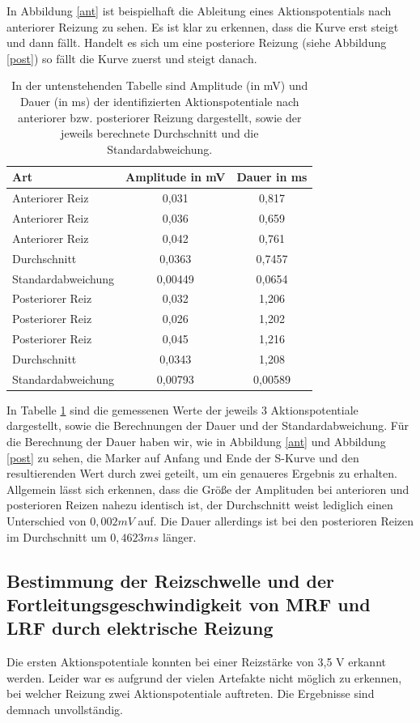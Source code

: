 \documentclass[11pt]{article}
\begin{document}
In Abbildung \ref{ant} ist beispielhaft die Ableitung eines Aktionspotentials nach anteriorer Reizung zu sehen. Es ist klar zu erkennen, dass die Kurve erst steigt und dann fällt. Handelt es sich um eine posteriore Reizung (siehe Abbildung \ref{post}) so fällt die Kurve zuerst und steigt danach.

\begin{table}[H]
\caption{In der untenstehenden Tabelle sind Amplitude (in mV) und Dauer (in ms) der identifizierten Aktionspotentiale nach anteriorer bzw. posteriorer Reizung dargestellt, sowie der jeweils berechnete Durchschnitt und die Standardabweichung.}
\begin{center}
\begin{tabular}{l||c|c}
Art & Amplitude in mV & Dauer in ms \\
\hline\hline
Anteriorer Reiz & 0,031 & 0,817\\
Anteriorer Reiz & 0,036 & 0,659\\
Anteriorer Reiz & 0,042 & 0,761\\
\hline
Durchschnitt & 0,0363& 0,7457\\
Standardabweichung & 0,00449 &0,0654 \\
\hline\hline
Posteriorer Reiz & 0,032 & 1,206\\
Posteriorer Reiz & 0,026& 1,202\\
Posteriorer Reiz & 0,045 & 1,216\\
\hline
Durchschnitt & 0,0343 & 1,208\\
Standardabweichung & 0,00793& 0,00589
\end{tabular}
\end{center}
\label{werte}
\end{table}

In Tabelle \ref{werte} sind die gemessenen Werte der jeweils 3 Aktionspotentiale dargestellt, sowie die Berechnungen der Dauer und der Standardabweichung. Für die Berechnung der Dauer haben wir, wie in Abbildung \ref{ant} und Abbildung \ref{post} zu sehen, die Marker auf Anfang und Ende der S-Kurve und den resultierenden Wert durch zwei geteilt, um ein genaueres Ergebnis zu erhalten.\\
Allgemein lässt sich erkennen, dass die Größe der Amplituden bei anterioren und posterioren Reizen nahezu identisch ist, der Durchschnitt weist lediglich einen Unterschied von $0,002 mV$ auf. Die Dauer allerdings ist bei den posterioren Reizen im Durchschnitt um $0,4623 ms$ länger.


\subsection{Bestimmung der Reizschwelle und der Fortleitungsgeschwindigkeit von MRF und LRF durch elektrische Reizung}
Die ersten Aktionspotentiale konnten bei einer Reizstärke von 3,5 V erkannt werden. Leider war es aufgrund der vielen Artefakte nicht möglich zu erkennen, bei welcher Reizung zwei Aktionspotentiale auftreten. Die Ergebnisse sind demnach unvollständig. 
\end{document}
